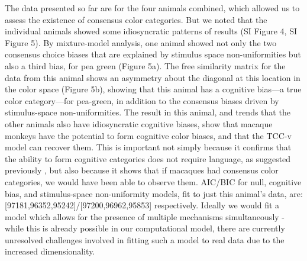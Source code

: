 \documentclass[9pt,biorxiv,lineno,onehalfspacing]{lapreprint}
\begin{document}
\begin{refsection}
The data presented so far are for the four animals combined, which allowed us to assess the existence of consensus color categories. 
But we noted that the individual animals showed some idiosyncratic patterns of results (SI Figure 4, SI Figure 5). 
By mixture-model analysis, one animal showed not only the two consensus choice biases that are explained by stimulus space non-uniformities but also a third bias, for pea green (Figure 5a). 
The free similarity matrix for the data from this animal shows an asymmetry about the diagonal at this location in the color space (Figure 5b), showing that this animal has a cognitive bias---a true color category---for pea-green, in addition to the consensus biases driven by stimulus-space non-uniformities. 
The result in this animal, and trends that the other animals also have idiosyncratic cognitive biases, show that macaque monkeys have the potential to form cognitive color biases, and that the TCC-v model can recover them. 
This is important not simply because it confirms that the ability to form cognitive categories does not require language, as suggested previously \citep{panichello_error-correcting_2019}, but also because it shows that if macaques had consensus color categories, we would have been able to observe them.
AIC/BIC for null, cognitive bias, and stimulus-space non-uniformity models, fit to just this animal's data, are: [97181,96352,95242]/[97200,96962,95853] respectively.
Ideally we would fit a model which allows for the presence of multiple mechanisms simultaneously - while this is already possible in our computational model, there are currently unresolved challenges involved in fitting such a model to real data due to the increased dimensionality. 


\end{refsection}
\end{document}
